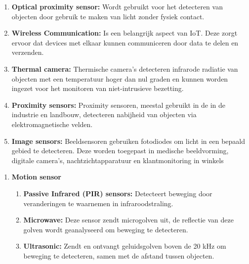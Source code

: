 {\begin{enumerate}
    \item \textbf{Optical proximity sensor:} Wordt gebruikt voor het detecteren van objecten door gebruik te maken van licht zonder fysiek contact.
    
    \item \textbf{Wireless Communication:} Is een belangrijk aspect van IoT. Deze zorgt ervoor dat devices met elkaar kunnen communiceren door data te delen en verzenden.
    
    \item \textbf{Thermal camera:} Thermische camera's detecteren infrarode radiatie van objecten met een temperatuur hoger dan nul graden en kunnen worden ingezet voor het monitoren van niet-intrusieve bezetting.
    
    \item \textbf{Proximity sensors:} Proximity sensoren, meestal gebruikt in de in de industrie en landbouw, detecteren nabijheid van objecten via elektromagnetische velden.
    
    \item \textbf{Image sensors:} Beeldsensoren gebruiken fotodiodes om licht in een bepaald gebied te detecteren. Deze worden toegepast in medische beeldvorming, digitale camera's, nachtzichtapparatuur  en klantmonitoring in winkels

\end{enumerate}

\begin{enumerate}
    \item \textbf{Motion sensor}
    \begin{enumerate}
        \item \textbf{Passive Infrared (PIR) sensors:} Detecteert beweging door veranderingen te waarnemen in infraroodstraling.
        \item \textbf{Microwave:} Deze sensor zendt microgolven uit, de reflectie van deze golven wordt geanalyseerd om beweging te detecteren.
        \item \textbf{Ultrasonic:} Zendt en ontvangt geluidsgolven boven de 20 kHz om beweging te detecteren, samen met de afstand tussen objecten.
    \end{enumerate}
    
    

\end{enumerate}}
